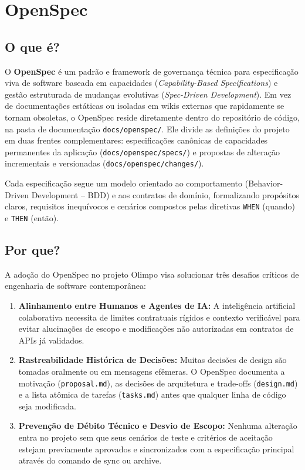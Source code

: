 \documentclass[12pt,a4paper]{article}
\begin{document}
\section{OpenSpec}

\subsection{O que é?}
O \textbf{OpenSpec} é um padrão e framework de governança técnica para especificação viva de software baseada em capacidades (\textit{Capability-Based Specifications}) e gestão estruturada de mudanças evolutivas (\textit{Spec-Driven Development}). Em vez de documentações estáticas ou isoladas em wikis externas que rapidamente se tornam obsoletas, o OpenSpec reside diretamente dentro do repositório de código, na pasta de documentação \texttt{docs/openspec/}. Ele divide as definições do projeto em duas frentes complementares: especificações canônicas de capacidades permanentes da aplicação (\texttt{docs/openspec/specs/}) e propostas de alteração incrementais e versionadas (\texttt{docs/openspec/changes/}).

Cada especificação segue um modelo orientado ao comportamento (Behavior-Driven Development -- BDD) e aos contratos de domínio, formalizando propósitos claros, requisitos inequívocos e cenários compostos pelas diretivas \texttt{WHEN} (quando) e \texttt{THEN} (então).

\subsection{Por que?}
A adoção do OpenSpec no projeto Olimpo visa solucionar três desafios críticos de engenharia de software contemporânea:
\begin{enumerate}
  \item \textbf{Alinhamento entre Humanos e Agentes de IA:} A inteligência artificial colaborativa necessita de limites contratuais rígidos e contexto verificável para evitar alucinações de escopo e modificações não autorizadas em contratos de APIs já validados.
  \item \textbf{Rastreabilidade Histórica de Decisões:} Muitas decisões de design são tomadas oralmente ou em mensagens efêmeras. O OpenSpec documenta a motivação (\texttt{proposal.md}), as decisões de arquitetura e trade-offs (\texttt{design.md}) e a lista atômica de tarefas (\texttt{tasks.md}) antes que qualquer linha de código seja modificada.
  \item \textbf{Prevenção de Débito Técnico e Desvio de Escopo:} Nenhuma alteração entra no projeto sem que seus cenários de teste e critérios de aceitação estejam previamente aprovados e sincronizados com a especificação principal através do comando de sync ou archive.
\end{enumerate}
\end{document}
